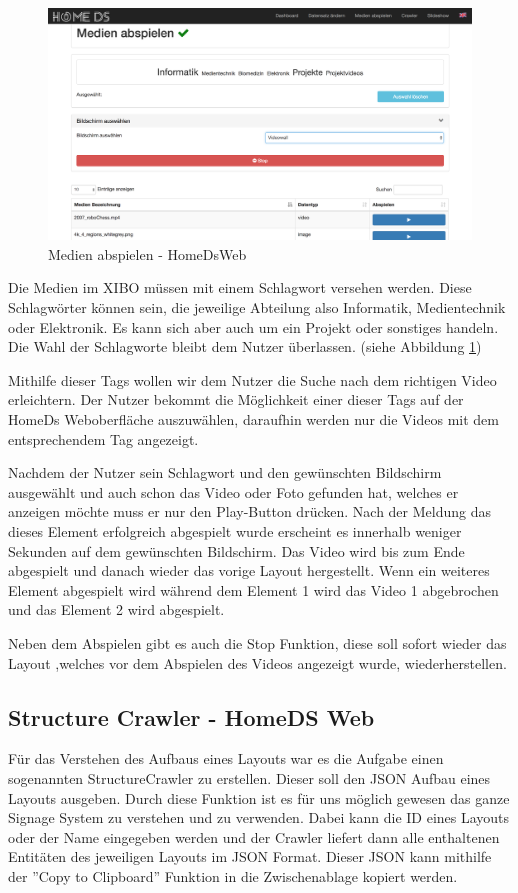 \begin{figure}[H]
\centering
\includegraphics[width=1\textwidth]{images/08_HomeDsWeb/PlayMediaOverview.png}
\caption{Medien abspielen - HomeDsWeb}
\label{img:playmedia}
\end{figure}

Die Medien im XIBO müssen mit einem Schlagwort versehen werden. Diese Schlagwörter können sein, die jeweilige Abteilung also Informatik, Medientechnik oder Elektronik. Es kann sich aber auch um ein Projekt oder sonstiges handeln. Die Wahl der Schlagworte bleibt dem Nutzer überlassen. (siehe Abbildung \ref{img:playmedia})

Mithilfe dieser Tags wollen wir dem Nutzer die Suche nach dem richtigen Video erleichtern. Der Nutzer bekommt die Möglichkeit einer dieser Tags auf der HomeDs Weboberfläche auszuwählen, daraufhin werden nur die Videos mit dem entsprechendem Tag angezeigt.

Nachdem der Nutzer sein Schlagwort und den gewünschten Bildschirm ausgewählt und auch schon das Video oder Foto gefunden hat, welches er anzeigen möchte muss er nur den Play-Button drücken. Nach der Meldung das dieses Element erfolgreich abgespielt wurde erscheint es innerhalb weniger Sekunden auf dem gewünschten Bildschirm. Das Video wird bis zum Ende abgespielt und danach wieder das vorige Layout hergestellt. Wenn ein weiteres Element abgespielt wird während dem Element 1 wird das Video 1 abgebrochen und das Element 2 wird abgespielt.

Neben dem Abspielen gibt es auch die Stop Funktion, diese soll sofort wieder das Layout ,welches vor dem Abspielen des Videos angezeigt wurde, wiederherstellen.


\subsection{Structure Crawler - HomeDS Web}\label{sec:javaeestructurecrawler}
Für das Verstehen des Aufbaus eines Layouts war es die Aufgabe einen sogenannten StructureCrawler zu erstellen. Dieser soll den JSON Aufbau eines Layouts ausgeben. Durch diese Funktion ist es für uns möglich gewesen das ganze Signage System zu verstehen und zu verwenden. Dabei kann die ID eines Layouts oder der Name eingegeben werden und der Crawler liefert dann alle enthaltenen Entitäten des jeweiligen Layouts im JSON Format. Dieser JSON kann mithilfe der ''Copy to Clipboard'' Funktion in die Zwischenablage kopiert werden.

